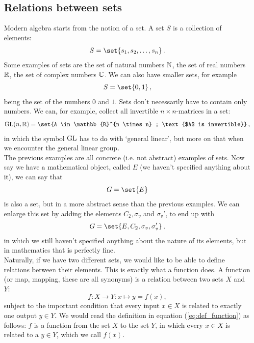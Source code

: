 \subsection{Relations between sets}
    Modern algebra starts from the notion of a set. A set $S$ is a collection of elements:
    \begin{equation}
        S = \set{s_1, s_2, \dots, s_n} \thinspace .
    \end{equation}
    Some examples of sets are the set of natural numbers $\mathbb{N}$, the set of real numbers $\mathbb{R}$, the set of complex numbers $\mathbb{C}$. We can also have smaller sets, for example
    \begin{equation}
        S = \set{0, 1} \thinspace ,
    \end{equation}
    being the set of the numbers $0$ and $1$. Sets don't necessarily have to contain only numbers. We can, for example, collect all invertible $n \times n$-matrices in a set:
    \begin{equation}
        \GLg(n, \mathbb{R}) = \set{A \in \mathbb{R}^{n \times n} ; \text{$A$ is invertible}} \thinspace ,
    \end{equation}
    in which the symbol $\operatorname{GL}$ has to do with `general linear', but more on that when we encounter the general linear group. \\

    The previous examples are all concrete (i.e. not abstract) examples of sets. Now say we have a mathematical object, called $E$ (we haven't specified anything about it), we can say that
    \begin{equation}
        G = \set{E}
    \end{equation}
    is also a set, but in a more abstract sense than the previous examples. We can enlarge this set by adding the elements $C_2, \sigma_v$ and $\sigma_v'$, to end up with
    \begin{equation}
        G = \set{E, C_2, \sigma_v, \sigma_v'} \thinspace ,
    \end{equation}
    in which we still haven't specified anything about the nature of its elements, but in mathematics that is perfectly fine. \\

    Naturally, if we have two different sets, we would like to be able to define relations between their elements. This is exactly what a function does. A function (or map, mapping, these are all synonyms) is a relation between two sets $X$ and $Y$:
    \begin{equation} \label{eq:def_function}
        f: X \rightarrow Y: x \mapsto y = f(x) ,
    \end{equation}
    subject to the important condition that every input $x \in X$ is related to exactly one output $y \in Y$. We would read the definition in equation (\ref{eq:def_function}) as follows: $f$ is a function from the set $X$ to the set $Y$, in which every $x \in X$ is related to a $y \in Y$, which we call $f(x)$. \\

